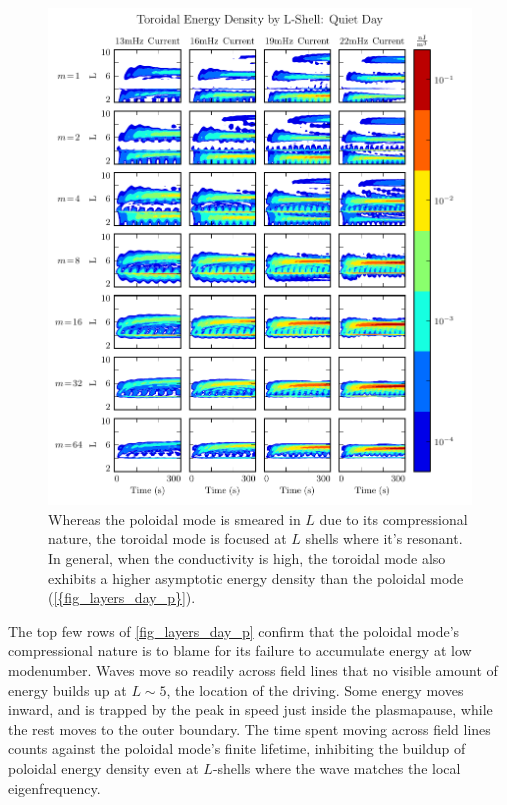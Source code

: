 \begin{figure}[!htb]
    \centering
    \includegraphics[width=\textwidth]{figures/layers_day_t.pdf}
    \caption[Dayside Toroidal Energy Distribution]{
      Whereas the poloidal mode is smeared in $L$ due to its compressional nature, the toroidal mode is focused at $L$ shells where it's resonant. In general, when the conductivity is high, the toroidal mode also exhibits a higher asymptotic energy density than the poloidal mode (\cref{{fig_layers_day_p}}). 
    }
    \label{fig_layers_day_t}
\end{figure}

The top few rows of \cref{fig_layers_day_p} confirm that the poloidal mode's compressional nature is to blame for its failure to accumulate energy at low modenumber. Waves move so readily across field lines that no visible amount of energy builds up at $L \sim 5$, the location of the driving. Some energy moves inward, and is trapped by the peak in \Alfven speed just inside the plasmapause, while the rest moves to the outer boundary. The time spent moving across field lines counts against the poloidal mode's finite lifetime, inhibiting the buildup of poloidal energy density even at $L$-shells where the wave matches the local eigenfrequency. 

